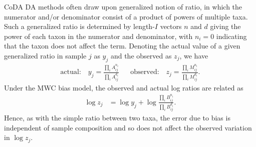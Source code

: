 \documentclass[
]{article}
\theoremstyle{definition}
\theoremstyle{definition}
\theoremstyle{definition}
\theoremstyle{definition}
\theoremstyle{remark}
\begin{document}
CoDA DA methods often draw upon generalized notion of ratio, in which the numerator and/or denominator consist of a product of powers of multiple taxa.
Such a generalized ratio is determined by length-\(I\) vectors \(n\) and \(d\) giving the power of each taxon in the numerator and denominator, with \(n_i = 0\) indicating that the taxon does not affect the term.
Denoting the actual value of a given generalized ratio in sample \(j\) as \(y_j\) and the observed as \(z_j\), we have
\begin{align}
  \label{eq:generalized-ratio}
  \text{actual:}   \quad  y_j = \frac{\prod_i A_{ij}^{n_i}}{\prod_i A_{ij}^{d_i}} &&
  \text{observed:} \quad  z_j = \frac{\prod_i M_{ij}^{n_i}}{\prod_i M_{ij}^{d_i}}.
\end{align}
Under the MWC bias model, the observed and actual log ratios are related as
\begin{align}
  \label{eq:generalized-ratio-log}
  \log z_j &= \log y_j + \log \frac{\prod_i B_{ij}^{n_i}}{\prod_i B_{ij}^{d_i}}.
\end{align}
Hence, as with the simple ratio between two taxa, the error due to bias is independent of sample composition and so does not affect the observed variation in \(\log z_j\).
\end{document}
